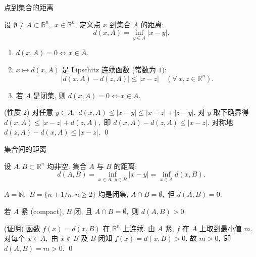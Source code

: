 
\begin{frame}{点到集合的距离}

\begin{Def}[点到集合的距离]
设 $\emptyset \neq A \subset \mathbb{R}^n,$ $x \in \mathbb{R}^n.$ 定义\alert{点 $x$ 到集合 $A$ 的距离}:
\[
  d(x, A) = \inf_{y \in A} |x - y|.
\]
\end{Def}

\pause

\begin{prop}[基本性质]
\begin{enumerate}
  \item $d(x, A) = 0 \iff x \in \overline{A}.$
  \item $x \mapsto d(x, A)$ 是 Lipschitz 连续函数 (常数为 $1$):
        \[|d(x, A) - d(z, A)| \leqslant |x - z| \quad (\forall ~ x, z \in \mathbb{R}^n).\]
  \item 若 $A$ 是闭集, 则 $d(x, A) = 0 \iff x \in A.$
\end{enumerate}
\end{prop}

\pause

\startproof[bg=yellow, fg=red](性质 2)
对任意 $y \in A:$ $d(x, A) \leqslant |x-y| \leqslant |x-z| + |z-y|.$ 对 $y$ 取下确界得
$d(x, A) \leqslant |x-z| + d(z, A),$ 即 $d(x,A) - d(z,A) \leqslant |x-z|.$
对称地 $d(z,A) - d(x,A) \leqslant |x-z|.$
\qed

\end{frame}


\begin{frame}{集合间的距离}

\begin{Def}[集合间的距离]
设 $A, B \subset \mathbb{R}^n$ 均非空. \alert{集合 $A$ 与 $B$ 的距离}:
\[
  d(A, B) = \inf_{x \in A, ~ y \in B} |x - y| = \inf_{x \in A} d(x, B).
\]
\end{Def}

\pause

\begin{attnblock}[$d(A,B) = 0 \not\Rightarrow A \cap B \neq \emptyset$]
$A = \mathbb{N},$ $B = \bigl\{n + 1/n : n \geqslant 2\bigr\}$ 均是闭集, $A \cap B = \emptyset,$ 但 $d(A, B) = 0.$
\end{attnblock}

\pause

\begin{prop}
若 $A$ 紧 (compact), $B$ 闭, 且 $A \cap B = \emptyset,$ 则 $d(A, B) > 0.$
\end{prop}

\startproof[bg=yellow, fg=red](证明)
函数 $f(x) = d(x, B)$ 在 $\mathbb{R}^n$ 上连续. 由 $A$ 紧, $f$ 在 $A$ 上取到最小值 $m.$ 对每个 $x \in A,$ 由 $x \notin B$ 及 $B$ 闭知 $f(x) = d(x, B) > 0.$ 故 $m > 0,$ 即 $d(A, B) = m > 0.$
\qed

\end{frame}

